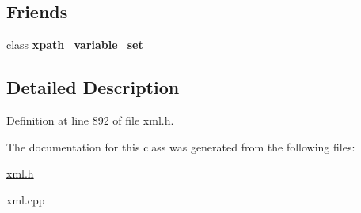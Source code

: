 \subsection*{Friends}
\begin{DoxyCompactItemize}
\item 
\hypertarget{classphys_1_1xml_1_1xpath__variable_ae065e6f4380a8a530c7352703c09ff80}{
class {\bfseries xpath\_\-variable\_\-set}}
\label{d8/d2c/classphys_1_1xml_1_1xpath__variable_ae065e6f4380a8a530c7352703c09ff80}

\end{DoxyCompactItemize}


\subsection{Detailed Description}


Definition at line 892 of file xml.h.



The documentation for this class was generated from the following files:\begin{DoxyCompactItemize}
\item 
\hyperlink{xml_8h}{xml.h}\item 
xml.cpp\end{DoxyCompactItemize}
